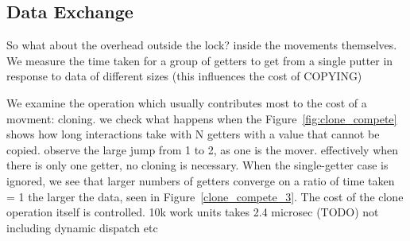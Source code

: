 \subsection{Data Exchange}
So what about the overhead outside the lock? inside the movements themselves. We measure the time taken for a group of getters to get from a single putter in response to data of different sizes (this influences the cost of COPYING)




We examine the operation which usually contributes most to the cost of a movment: cloning. we check what happens when the 
Figure~\ref{fig:clone_compete} shows how long interactions take with N getters with a value that cannot be copied. observe the large jump from 1 to 2, as one is the mover. effectively when there is only one getter, no cloning is necessary. When the single-getter case is ignored, we see that larger numbers of getters converge on a ratio of time taken = 1 the larger the data, seen in Figure~\ref{clone_compete_3}. The cost of the clone operation itself is controlled. 10k work units takes 2.4 microsec (TODO) not including dynamic dispatch etc
